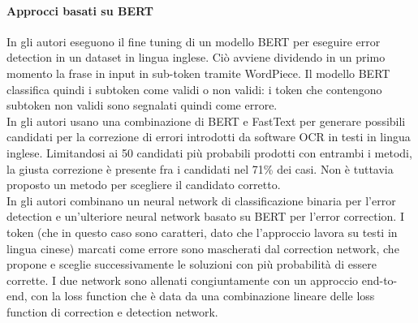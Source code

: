 \paragraph{Approcci basati su BERT}
In \cite{nguyen2020neural}  gli autori eseguono il fine tuning di un modello BERT per eseguire error detection in un dataset in lingua inglese. Ciò avviene dividendo in un primo momento la frase in input in sub-token tramite WordPiece. Il modello BERT classifica quindi i subtoken come validi o non validi: i token che contengono subtoken non validi sono segnalati quindi come errore.\\
In \cite{OCRMaskFilling} gli autori usano una combinazione di BERT e FastText per generare possibili candidati per la correzione di errori introdotti da software OCR in testi in lingua inglese. Limitandosi ai 50 candidati più probabili prodotti con entrambi i metodi, la giusta correzione è presente fra i candidati nel 71\% dei casi. Non è tuttavia proposto un metodo per scegliere il candidato corretto.\\
In \cite{zhang2020spelling} gli autori combinano un neural network di classificazione binaria per l'error detection e un'ulteriore neural network basato su BERT per l'error correction. I token (che in questo caso sono caratteri, dato che l'approccio lavora su testi in lingua cinese)  marcati come errore sono mascherati dal correction network, che propone e sceglie successivamente le soluzioni con più probabilità di essere corrette. I due network sono allenati congiuntamente con un approccio end-to-end, con la loss function che è data da una combinazione lineare delle loss function di correction e detection network.






















